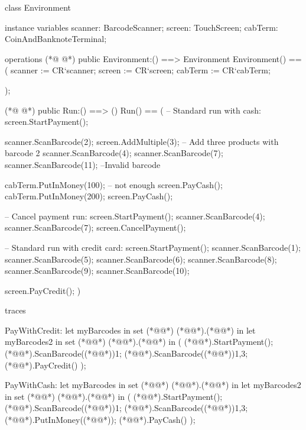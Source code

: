 \begin{vdmpp}
class Environment

instance variables
  scanner: BarcodeScanner;
  screen: TouchScreen;
  cabTerm: CoinAndBanknoteTerminal;

operations
(*@
\label{Environment:9}
@*)
 public Environment:() ==> Environment
 Environment() == 
  (
   scanner := CR`scanner;
   screen := CR`screen;
   cabTerm := CR`cabTerm;
   
  );
  
(*@
\label{Run:18}
@*)
 public Run:() ==> ()
 Run() ==
 (
 -- Standard run with cash:
  screen.StartPayment();
  
  scanner.ScanBarcode(2);
  screen.AddMultiple(3); -- Add three products with barcode 2
  scanner.ScanBarcode(4);
  scanner.ScanBarcode(7);
  scanner.ScanBarcode(11); --Invalid barcode
  
  cabTerm.PutInMoney(100); -- not enough
  screen.PayCash();
  cabTerm.PutInMoney(200);
  screen.PayCash();
 
 -- Cancel payment run: 
  screen.StartPayment();
  scanner.ScanBarcode(4);
  scanner.ScanBarcode(7);
  screen.CancelPayment(); 
 
 -- Standard run with credit card:
  screen.StartPayment();
  scanner.ScanBarcode(1);
  scanner.ScanBarcode(5);
  scanner.ScanBarcode(6);
  scanner.ScanBarcode(8);
  scanner.ScanBarcode(9);
  scanner.ScanBarcode(10);
  
  screen.PayCredit();
 )

traces

PayWithCredit: 
 let myBarcodes in set (*@@*) (*@@*).(*@@*)
 in
  let myBarcodes2 in set (*@@*) (*@@*).(*@@*)
  in
  (
   (*@@*).StartPayment();
   (*@@*).ScanBarcode((*@@*)){1};
   (*@@*).ScanBarcode((*@@*)){1,3};
   (*@@*).PayCredit()
  );


PayWithCash: 
 let myBarcodes in set (*@@*) (*@@*).(*@@*)
 in
  let myBarcodes2 in set (*@@*) (*@@*).(*@@*)
  in
  (
   (*@@*).StartPayment();
   (*@@*).ScanBarcode((*@@*)){1};
   (*@@*).ScanBarcode((*@@*)){1,3};
   (*@@*).PutInMoney((*@@*));
   (*@@*).PayCash()
  );
       

\end{vdmpp}
